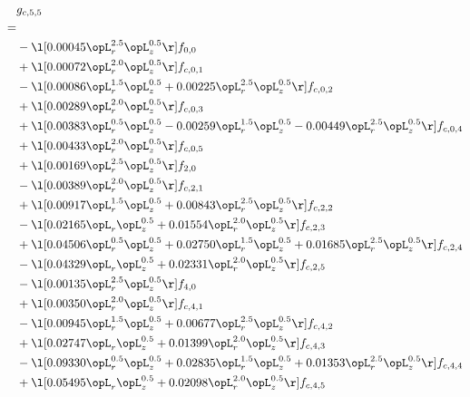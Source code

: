 \begin{alignat}{2} 
\label{eq:g_55_0} 
& g_{c,5,5} \nonumber \\ 
 = \\ 
& - \l[  0.00045 \opL_r^{2.5} \opL_z^{0.5}  \r] f_{0,0} \nonumber \\ 
& + \l[  0.00072 \opL_r^{2.0} \opL_z^{0.5}  \r] f_{c,0,1} \nonumber \\ 
& - \l[  0.00086 \opL_r^{1.5} \opL_z^{0.5} +  0.00225 \opL_r^{2.5} \opL_z^{0.5}  \r] f_{c,0,2} \nonumber \\ 
& + \l[  0.00289 \opL_r^{2.0} \opL_z^{0.5}  \r] f_{c,0,3} \nonumber \\ 
& + \l[  0.00383 \opL_r^{0.5} \opL_z^{0.5}   -0.00259 \opL_r^{1.5} \opL_z^{0.5}   -0.00449 \opL_r^{2.5} \opL_z^{0.5}  \r] f_{c,0,4} \nonumber \\ 
& + \l[  0.00433 \opL_r^{2.0} \opL_z^{0.5}  \r] f_{c,0,5} \nonumber \\ 
& + \l[  0.00169 \opL_r^{2.5} \opL_z^{0.5}  \r] f_{2,0} \nonumber \\ 
& - \l[  0.00389 \opL_r^{2.0} \opL_z^{0.5}  \r] f_{c,2,1} \nonumber \\ 
& + \l[  0.00917 \opL_r^{1.5} \opL_z^{0.5} +  0.00843 \opL_r^{2.5} \opL_z^{0.5}  \r] f_{c,2,2} \nonumber \\ 
& - \l[  0.02165 \opL_r \opL_z^{0.5} +  0.01554 \opL_r^{2.0} \opL_z^{0.5}  \r] f_{c,2,3} \nonumber \\ 
& + \l[  0.04506 \opL_r^{0.5} \opL_z^{0.5} +  0.02750 \opL_r^{1.5} \opL_z^{0.5} +  0.01685 \opL_r^{2.5} \opL_z^{0.5}  \r] f_{c,2,4} \nonumber \\ 
& - \l[  0.04329 \opL_r \opL_z^{0.5} +  0.02331 \opL_r^{2.0} \opL_z^{0.5}  \r] f_{c,2,5} \nonumber \\ 
& - \l[  0.00135 \opL_r^{2.5} \opL_z^{0.5}  \r] f_{4,0} \nonumber \\ 
& + \l[  0.00350 \opL_r^{2.0} \opL_z^{0.5}  \r] f_{c,4,1} \nonumber \\ 
& - \l[  0.00945 \opL_r^{1.5} \opL_z^{0.5} +  0.00677 \opL_r^{2.5} \opL_z^{0.5}  \r] f_{c,4,2} \nonumber \\ 
& + \l[  0.02747 \opL_r \opL_z^{0.5} +  0.01399 \opL_r^{2.0} \opL_z^{0.5}  \r] f_{c,4,3} \nonumber \\ 
& - \l[  0.09330 \opL_r^{0.5} \opL_z^{0.5} +  0.02835 \opL_r^{1.5} \opL_z^{0.5} +  0.01353 \opL_r^{2.5} \opL_z^{0.5}  \r] f_{c,4,4} \nonumber \\ 
& + \l[  0.05495 \opL_r \opL_z^{0.5} +  0.02098 \opL_r^{2.0} \opL_z^{0.5}  \r] f_{c,4,5} \nonumber \\ 
\end{alignat} 


